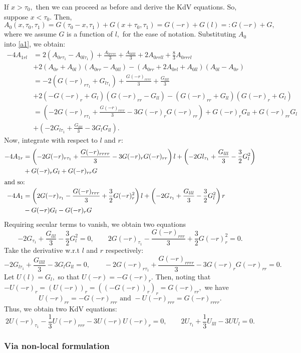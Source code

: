 \documentclass[10pt,reqno,oneside,a4paper]{article}
\begin{document}
If $x > \tau_0,$ then we can proceed as before and derive the KdV equations. So, suppose $x < \tau_0.$ Then, 
\[A_0(x, \tau_0, \tau_1) = G(\tau_0- x, \tau_1) + G(x+\tau_0, \tau_1) = G(-r) + G(l) =: G(-r) + G,\]
where we assume $G$ is a function of $l,$ for the ease of notation. Substituting $A_0$ into \eqref{a1}, we obtain:
\begin{align*}
-4A_{1rl} &= 2(A_{0 r\tau_{1}} - A_{0l\tau_1}) + \frac{A_{0rrrr}}{3} + \frac{A_{0llll}}{3} + 2A_{0rrll} +\frac{8}{3}A_{0rrrl} \\
&+ 2(A_{0r} +  A_{0l})(A_{0rr} - A_{0ll}) - (A_{0rr} + 2A_{0rl} + A_{0ll})(A_{0l} - A_{0r}) \\
&= - 2(G(-r)_{r\tau_{1}} + G_{l\tau_{1}}) + \frac{G(-r)_{rrrr}}{3} + \frac{G_{llll}}{3}  \\
&+ 2\left(-G(-r)_r + G_l\right)\left(G(-r)_{rr} - G_{ll}\right) - \left( G(-r)_{rr} + G_{ll}\right)\left(G(-r)_r + G_l\right) \\
&= (-2G(-r)_{r\tau_{1}} + \frac{G(-r)_{rrrr}}{3} - 3G(-r)_rG(-r)_{rr}) +G(-r)_rG_{ll} + G(-r)_{rr}G_l \\
&+ (-2G_{l\tau_{1}} + \frac{G_{llll}}{3} - 3G_l G_{ll}).
\end{align*}
Now, integrate with respect to $l$ and $r$:
\begin{align*}
-4A_{1r} &= \left(-2G(-r)_{r\tau_{1}} + \frac{G(-r)_{rrrr}}{3} - 3G(-r)_rG(-r)_{rr}\right)l + \left(-2Gl_{\tau_{1}} + \frac{G_{lll}}{3} - \frac{3}{2}G_l^2\right) \\
&+ G(-r)_rG_{l} + G(-r)_{rr}G \\
\intertext{and so:}
-4A_{1} &=  \left(2G(-r)_{\tau_{1}} - \frac{G(-r)_{rrr}}{3} + \frac{3}{2}G(-r)_r^2 \right)l + \left(-2G_{\tau_{1}} + \frac{G_{lll}}{3} - \frac{3}{2}G_l^2\right)r \\
&- G(-r)G_{l} - G(-r)_{r}G
\end{align*} 
Requiring secular terms to vanish, we obtain two equations
\[ -2G_{\tau_{1}} + \frac{G_{lll}}{3} - \frac{3}{2}G_l^2 = 0, \qquad 2G(-r)_{\tau_{1}} - \frac{G(-r)_{rrr}}{3} + \frac{3}{2}G(-r)_r^2 = 0. \]
Take the derivative w.r.t $l$ and $r$ respectively:
\[ -2G_{l\tau_{1}} + \frac{G_{llll}}{3} - 3G_l G_{ll} = 0, \qquad -2G(-r)_{r\tau_{1}} + \frac{G(-r)_{rrrr}}{3} - 3G(-r)_rG(-r)_{rr} = 0. \]
Let $U(l) = G_l,$ so that $U(-r) = - G(-r)_r.$  Then, noting that $-U(-r)_r = (U(-r))_r = ((-G(-r))_r)_r = G(-r)_{rr},$ we have
\[U(-r)_{rr} = -G(-r)_{rrr} \mbox{ and } -U(-r)_{rrr} = G(-r)_{rrrr}. \]
Thus, we obtain two KdV equations:
\[ 
2U(-r)_{\tau_1} - \frac{1}{3}U(-r)_{rrr} - 3U(-r)U(-r)_r = 0, \qquad 2U_{\tau_1} + \frac{1}{3}U_{lll} - 3UU_l = 0.
\]
\subsubsection{Via non-local formulation}



{\small}
\end{document}
